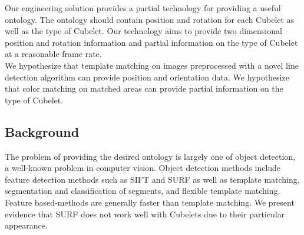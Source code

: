 \documentclass[conference]{IEEEtran}
\begin{document}
Our engineering solution provides a partial technology for providing a useful ontology. The ontology should contain position and rotation for each Cubelet as well as the type of Cubelet. Our technology aims to provide two dimensional position and rotation information and partial information on the type of Cubelet at a reasonable frame rate.\\

We hypothesize that template matching on images preprocessed with a novel line detection algorithm can provide position and orientation data. We hypothesize that color matching on matched areas can provide partial information on the type of Cubelet.

\subsection{Background}
The problem of providing the desired ontology is largely one of object detection, a well-known problem in computer vision. Object detection methods include feature detection methods such as SIFT \cite{SIFT} and SURF \cite{SURF} as well as template matching, segmentation and classification of segments, and flexible template matching. Feature based-methods are generally faster than template matching. We present evidence that SURF does not work well with Cubelets due to their particular appearance.

%
%

\end{document}
